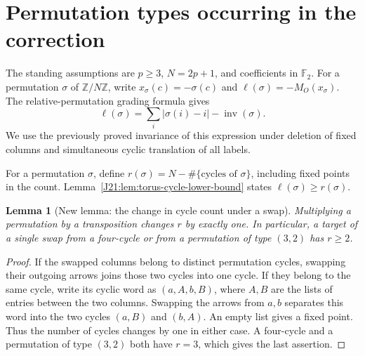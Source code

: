 \documentclass[11pt,oneside]{report}
\newtheorem{lemma}[theorem]{Lemma}
\theoremstyle{definition}
\numberwithin{equation}{section}
\begin{document}
\section{Permutation types occurring in the correction}
\label{J21:sec:torus-types}

The standing assumptions are $p\geq3$, $N=2p+1$, and coefficients in
$\mathbb F _2$. For a permutation $\sigma$ of $\mathbb Z/N\mathbb Z$,
write $x_\sigma(c)=-\sigma(c)$ and $\ell(\sigma)=-M_O(x_\sigma)$.
The relative-permutation grading formula gives
\[
 \ell(\sigma)=\sum_i|\sigma(i)-i|-\operatorname{inv}(\sigma).
\]
We use the previously proved invariance of this expression under deletion
of fixed columns and simultaneous cyclic translation of all labels.


For a permutation $\sigma$, define
$r(\sigma)=N-\#\{\text{cycles of }\sigma\}$, including fixed points
in the count. Lemma~\ref{J21:lem:torus-cycle-lower-bound} states
$\ell(\sigma)\geq r(\sigma)$.

\begin{lemma}[New lemma: the change in cycle count under a swap]
\label{J21:lem:torus-transposition-cycle-count}
Multiplying a permutation by a transposition changes $r$ by exactly
one. In particular, a target of a single swap from a four-cycle or
from a permutation of type $(3,2)$ has $r\geq2$.
\end{lemma}
\begin{proof}
If the swapped columns belong to distinct permutation cycles, swapping
their outgoing arrows joins those two cycles into one cycle. If they
belong to the same cycle, write its cyclic word as $(a,A,b,B)$, where
$A,B$ are the lists of entries between the two columns. Swapping the
arrows from $a,b$ separates this word into the two cycles $(a,B)$ and
$(b,A)$. An empty list gives a fixed point. Thus the number of cycles
changes by one in either case. A four-cycle and a permutation of type
$(3,2)$ both have $r=3$, which gives the last assertion.
\end{proof}
\end{document}
